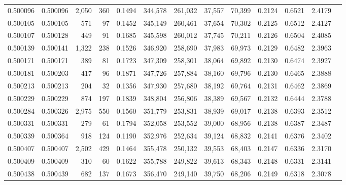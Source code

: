 \begin{tabular}{rrrrrrrrrrrrr}
0.500096 & 0.500096 & 2,050 &   360 &                                     0.1494 & 344,578 & 261,032 &  37,557 &  70,399 & 0.2124 & 0.6521 & 2.4179 \\
0.500105 & 0.500105 &   571 &    97 &                                     0.1452 & 345,149 & 260,461 &  37,654 &  70,302 & 0.2125 & 0.6512 & 2.4127 \\
0.500107 & 0.500128 &   449 &    91 &                                     0.1685 & 345,598 & 260,012 &  37,745 &  70,211 & 0.2126 & 0.6504 & 2.4085 \\
0.500139 & 0.500141 & 1,322 &   238 &                                     0.1526 & 346,920 & 258,690 &  37,983 &  69,973 & 0.2129 & 0.6482 & 2.3963 \\
0.500171 & 0.500171 &   389 &    81 &                                     0.1723 & 347,309 & 258,301 &  38,064 &  69,892 & 0.2130 & 0.6474 & 2.3927 \\
0.500181 & 0.500203 &   417 &    96 &                                     0.1871 & 347,726 & 257,884 &  38,160 &  69,796 & 0.2130 & 0.6465 & 2.3888 \\
0.500213 & 0.500213 &   204 &    32 &                                     0.1356 & 347,930 & 257,680 &  38,192 &  69,764 & 0.2131 & 0.6462 & 2.3869 \\
0.500229 & 0.500229 &   874 &   197 &                                     0.1839 & 348,804 & 256,806 &  38,389 &  69,567 & 0.2132 & 0.6444 & 2.3788 \\
0.500284 & 0.500326 & 2,975 &   550 &                                     0.1560 & 351,779 & 253,831 &  38,939 &  69,017 & 0.2138 & 0.6393 & 2.3512 \\
0.500331 & 0.500331 &   279 &    61 &                                     0.1794 & 352,058 & 253,552 &  39,000 &  68,956 & 0.2138 & 0.6387 & 2.3487 \\
0.500339 & 0.500364 &   918 &   124 &                                     0.1190 & 352,976 & 252,634 &  39,124 &  68,832 & 0.2141 & 0.6376 & 2.3402 \\
0.500407 & 0.500407 & 2,502 &   429 &                                     0.1464 & 355,478 & 250,132 &  39,553 &  68,403 & 0.2147 & 0.6336 & 2.3170 \\
0.500409 & 0.500409 &   310 &    60 &                                     0.1622 & 355,788 & 249,822 &  39,613 &  68,343 & 0.2148 & 0.6331 & 2.3141 \\
0.500438 & 0.500439 &   682 &   137 &                                     0.1673 & 356,470 & 249,140 &  39,750 &  68,206 & 0.2149 & 0.6318 & 2.3078 \\

\end{tabular}
